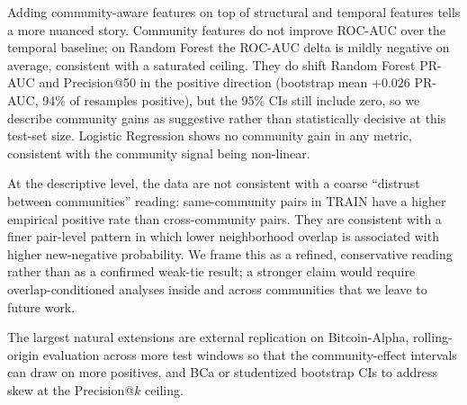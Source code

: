 \documentclass[conference]{IEEEtran}
\begin{document}
Adding community-aware features on top of structural and temporal
features tells a more nuanced story. Community features do not
improve ROC-AUC over the temporal baseline; on Random Forest the
ROC-AUC delta is mildly negative on average, consistent with a
saturated ceiling. They do shift Random Forest PR-AUC and
Precision@50 in the positive direction (bootstrap mean
$+0.026$ PR-AUC, 94\% of resamples positive), but the 95\% CIs still
include zero, so we describe community gains as suggestive rather
than statistically decisive at this test-set size. Logistic
Regression shows no community gain in any metric, consistent with the
community signal being non-linear.

At the descriptive level, the data are not consistent with a coarse
``distrust between communities'' reading: same-community pairs in
TRAIN have a higher empirical positive rate than cross-community
pairs. They are consistent with a finer pair-level pattern in which
lower neighborhood overlap is associated with higher new-negative
probability. We frame this as a refined, conservative reading rather
than as a confirmed weak-tie result; a stronger claim would require
overlap-conditioned analyses inside and across communities that we
leave to future work.

The largest natural extensions are external replication on
Bitcoin-Alpha, rolling-origin evaluation across more test windows so
that the community-effect intervals can draw on more positives, and
BCa or studentized bootstrap CIs to address skew at the
Precision@$k$ ceiling.
\end{document}
